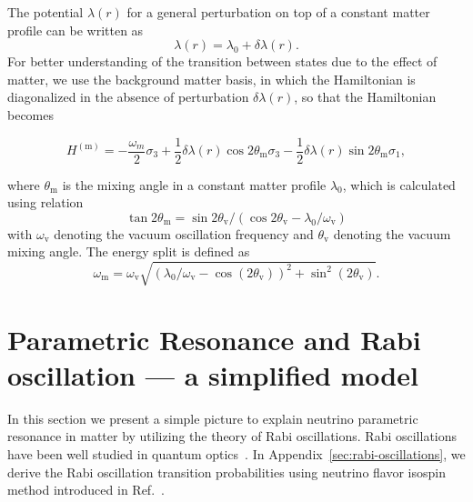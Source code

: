 \documentclass[%
reprint,
 amsmath,amssymb,
 aps,
]{revtex4-1}
\begin{document}
The potential $\lambda(r)$ for a general perturbation on top of a constant matter profile can be written as
\begin{equation}
    \lambda(r) = \lambda_0 + \delta \lambda(r).
    \label{eq-general-matter-profile}
\end{equation}
For better understanding of the transition between states due to the effect of matter, we use the background matter basis, in which the Hamiltonian is diagonalized in the absence of perturbation $\delta\lambda(r)$, so that the Hamiltonian becomes
\begin{widetext}
\begin{equation}
    H^{(\mathrm{m})} = -\frac{\omega_m}{2} \sigma_3 + \frac{1}{2} \delta\lambda(r) \cos 2\theta_{\mathrm m} \sigma_3 
     - \frac{1}{2} \delta\lambda(r) \sin 2\theta_{\mathrm m} \sigma_1,
    \label{eq-hamiltonian-bg-matter-basis-general}
\end{equation}
\end{widetext}
where $\theta_{\mathrm m}$ is the mixing angle in a constant matter profile $\lambda_0$, which is calculated using relation
\begin{equation*}
\tan 2\theta_{\mathrm{m}}=\sin 2\theta_{\mathrm v}/\left( \cos 2\theta_{\mathrm v} - \lambda_0/\omega_{\mathrm v} \right)
\end{equation*}
with $\omega_{\mathrm v}$ denoting the vacuum oscillation frequency and $\theta_{\mathrm v}$ denoting the vacuum mixing angle. The energy split is defined as
\begin{equation}
\omega_{\mathrm{m}} = \omega_{\mathrm{v}} \sqrt{ ( \lambda_0/\omega_{\mathrm{v}} - \cos (2\theta_{\mathrm{v}}) )^2 + \sin^2(2\theta_{\mathrm{v}}) }.
\end{equation}





\section{\label{sec:simple}Parametric Resonance and Rabi oscillation --- a simplified model}%


In this section we present a simple picture to explain neutrino parametric resonance in matter by utilizing the theory of Rabi oscillations. Rabi oscillations have been well studied in quantum optics~\cite{Boyd2008}. In Appendix~\ref{sec:rabi-oscillations}, we derive the Rabi oscillation transition probabilities using neutrino flavor isospin method introduced in Ref.~.
\end{document}

